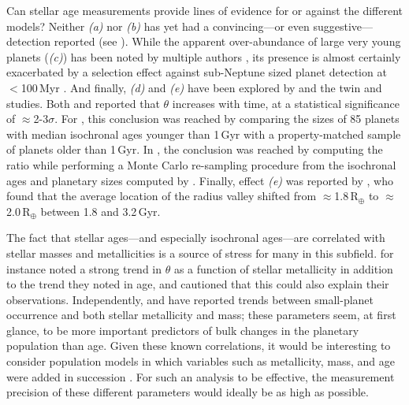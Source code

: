 \documentclass[11pt,twocolumn,tighten]{aastex63}
\begin{document}
Can stellar age measurements provide lines of evidence for or against
the different models?  Neither {\it (a)} nor {\it (b)} has yet had a
convincing---or even suggestive--- detection reported (see
\citealt{Petigura_2022}).  While the apparent over-abundance of large
very young planets ({\it (c)}) has been noted by multiple authors
\citep[e.g.][]{Bouma_2020,Mann_2022}, its presence is almost certainly
exacerbated by a selection effect against sub-Neptune sized planet
detection at $<$100\,Myr \citep{Zhou_2021,Bouma_2022}.  And finally,
{\it (d)} and {\it (e)} have been explored by
\citet{Berger_2020b_rpage} and the twin \citet{David_2021} and
\citet{Sandoval_2021} studies.  Both \citet{Berger_2020b_rpage} and
\citet{Sandoval_2021} reported that $\theta$ increases with time, at a
statistical significance of $\approx$2-3$\sigma$.  For
\citet{Berger_2020b_rpage}, this conclusion was reached by comparing
the sizes of 85 planets with median isochronal ages younger than
1\,Gyr with a property-matched sample of planets older than 1\,Gyr.
In \citet{Sandoval_2021}, the conclusion was reached by computing the
ratio while performing a Monte Carlo re-sampling procedure from the
isochronal ages and planetary sizes computed by
\citet{Fulton_Petigura_2018_cks_vii}.  Finally, effect {\it (e)} was
reported by \citet{David_2021}, who found that the average location of
the radius valley shifted from $\approx$1.8\,R$_\oplus$ to
$\approx$2.0\,R$_\oplus$ between 1.8 and 3.2\,Gyr.

The fact that stellar ages---and especially isochronal ages---are
correlated with stellar masses and metallicities is a source of stress
for many in this subfield.  \citet{Sandoval_2021} for instance noted a
strong trend in $\theta$ as a function of stellar metallicity in
addition to the trend they noted in age, and cautioned that this could
also explain their observations.  Independently, \citet{Petigura_2018}
and \citet{Petigura_2022} have reported trends between small-planet
occurrence and both stellar metallicity and mass; these parameters
seem, at first glance, to be more important predictors of bulk changes
in the planetary population than age.  Given these known correlations,
it would be interesting to consider population models in which
variables such as metallicity, mass, and age were added in succession
\citep[e.g.][]{Thorngren_2021}.  For such an analysis to be effective,
the measurement precision of these different parameters would ideally
be as high as possible.
\end{document}
